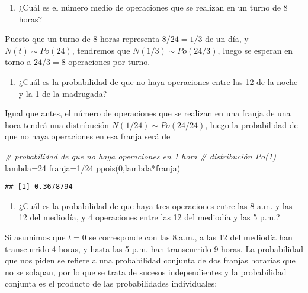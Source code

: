 \documentclass[
]{book}
\newenvironment{Shaded}{\begin{snugshade}}{\end{snugshade}}
\newcommand{\CommentTok}[1]{\textcolor[rgb]{0.56,0.35,0.01}{\textit{#1}}}
\newcommand{\DecValTok}[1]{\textcolor[rgb]{0.00,0.00,0.81}{#1}}
\newcommand{\FunctionTok}[1]{\textcolor[rgb]{0.00,0.00,0.00}{#1}}
\newcommand{\NormalTok}[1]{#1}
\newcommand{\OtherTok}[1]{\textcolor[rgb]{0.56,0.35,0.01}{#1}}
\newcommand{\SpecialCharTok}[1]{\textcolor[rgb]{0.00,0.00,0.00}{#1}}
\providecommand{\tightlist}{%
  \setlength{\itemsep}{0pt}\setlength{\parskip}{0pt}}
\theoremstyle{definition}
\theoremstyle{definition}
\theoremstyle{definition}
\theoremstyle{definition}
\theoremstyle{remark}
\begin{document}
\begin{enumerate}
\def\labelenumi{\arabic{enumi}.}
\tightlist
\item
  ¿Cuál es el número medio de operaciones que se realizan en un turno de 8 horas?
\end{enumerate}

Puesto que un turno de 8 horas representa \(8/24=1/3\) de un día, y \(N(t)\sim Po(24)\), tendremos que \(N(1/3)\sim Po(24/3)\), luego se esperan en torno a \(24/3=8\) operaciones por turno.

\begin{enumerate}
\def\labelenumi{\arabic{enumi}.}
\setcounter{enumi}{1}
\tightlist
\item
  ¿Cuál es la probabilidad de que no haya operaciones entre las 12 de la noche y la 1 de la madrugada?
\end{enumerate}

Igual que antes, el número de operaciones que se realizan en una franja de una hora tendrá una distribución \(N(1/24) \sim Po(24/24)\), luego la probabilidad de que no haya operaciones en esa franja será de

\begin{Shaded}
\begin{Highlighting}[]
\CommentTok{\# probabilidad de que no haya operaciones en 1 hora}
\CommentTok{\# distribución Po(1)}
\NormalTok{lambda}\OtherTok{=}\DecValTok{24}
\NormalTok{franja}\OtherTok{=}\DecValTok{1}\SpecialCharTok{/}\DecValTok{24}
\FunctionTok{ppois}\NormalTok{(}\DecValTok{0}\NormalTok{,lambda}\SpecialCharTok{*}\NormalTok{franja)}
\end{Highlighting}
\end{Shaded}

\begin{verbatim}
## [1] 0.3678794
\end{verbatim}

\begin{enumerate}
\def\labelenumi{\arabic{enumi}.}
\setcounter{enumi}{2}
\tightlist
\item
  ¿Cuál es la probabilidad de que haya tres operaciones entre las 8 a.m. y las 12 del mediodía, y 4 operaciones entre las 12 del mediodía y las 5 p.m.?
\end{enumerate}

Si asumimos que \(t=0\) se corresponde con las 8,a.m., a las 12 del mediodía han transcurrido 4 horas, y hasta las 5 p.m. han transcurrido 9 horas. La probabilidad que nos piden se refiere a una probabilidad conjunta de dos franjas horarias que no se solapan, por lo que se trata de sucesos independientes y la probabilidad conjunta es el producto de las probabilidades individuales:
\end{document}

